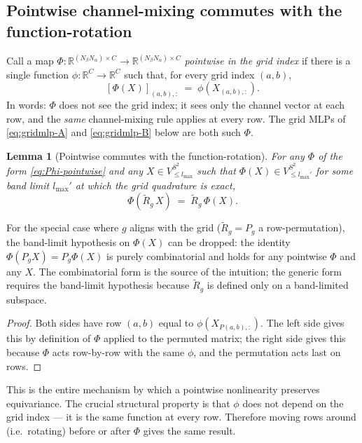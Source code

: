 \documentclass[11pt,a4paper]{article}
\newcommand{\R}{\mathbb{R}}
\newcommand{\Sph}{S^2}
\newcommand{\lmax}{l_{\max}}
\theoremstyle{plain}
\newtheorem{lemma}[theorem]{Lemma}
\theoremstyle{definition}
\theoremstyle{remark}
\begin{document}
\subsection{Pointwise channel-mixing commutes with the function-rotation}\label{sec:point-comm}

Call a map $\Phi\colon\R^{(N_\beta N_\alpha)\times C}\to\R^{(N_\beta
        N_\alpha)\times C}$ \emph{pointwise in the grid index} if there is a single
function $\phi\colon\R^C\to\R^C$ such that, for every grid index $(a,b)$,
\begin{equation}\label{eq:Phi-pointwise}
    [\Phi(X)]_{(a,b),:}\;=\;\phi(X_{(a,b),:}).
\end{equation}
In words: $\Phi$ does not see the grid index; it sees only the channel vector at each row, and the \emph{same} channel-mixing rule applies at every row.
The grid MLPs of \eqref{eq:gridmlp-A} and \eqref{eq:gridmlp-B} below are both such $\Phi$.

\begin{lemma}[Pointwise commutes with the function-rotation]\label{lem:point-perm}
    For any $\Phi$ of the form \eqref{eq:Phi-pointwise} and any $X\in V^{\Sph}_{\le\lmax}$ such that $\Phi(X)\in V^{\Sph}_{\le\lmax'}$ for some band limit $\lmax'$ at which the grid quadrature is exact,
    \begin{equation}\label{eq:point-perm}
        \Phi(\widetilde R_g\,X)\;=\;\widetilde R_g\,\Phi(X).
    \end{equation}
\end{lemma}

For the special case where $g$ aligns with the grid ($\widetilde R_g=P_g$ a
row-permutation), the band-limit hypothesis on $\Phi(X)$ can be dropped: the
identity $\Phi(P_g X)=P_g\Phi(X)$ is purely combinatorial and holds for any
pointwise $\Phi$ and any $X$. The combinatorial form is the source of the
intuition; the generic form requires the band-limit hypothesis because
$\widetilde R_g$ is defined only on a band-limited subspace.

\begin{proof}
    Both sides have row $(a,b)$ equal to $\phi(X_{P(a,b),:})$.
    The left side gives this by definition of $\Phi$ applied to the permuted matrix; the right side gives this because $\Phi$ acts row-by-row with the same $\phi$, and the permutation acts last on rows.
\end{proof}

This is the entire mechanism by which a pointwise nonlinearity preserves
equivariance. The crucial structural property is that $\phi$ does not depend on
the grid index — it is the same function at every row. Therefore moving rows
around (i.e.\ rotating) before or after $\Phi$ gives the same result.
\end{document}
